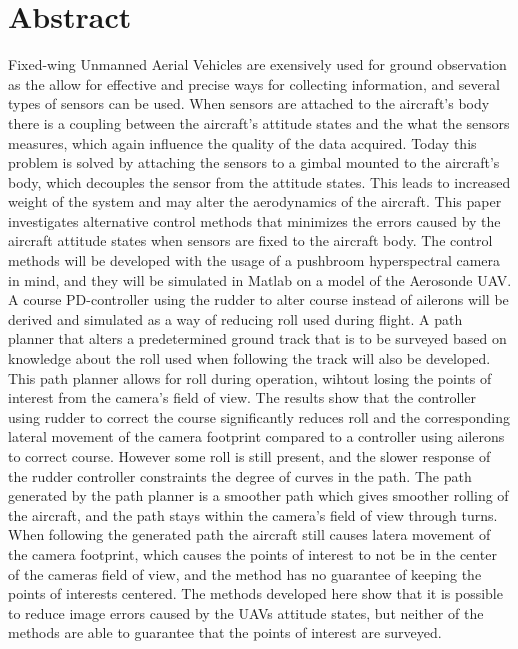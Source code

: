 \section*{Abstract}

Fixed-wing Unmanned Aerial Vehicles are exensively used for ground observation as the allow for effective and precise ways for collecting information, and several types of sensors can be used. When sensors are attached to the aircraft's body there is a coupling between the aircraft's attitude states and the what the sensors measures, which again influence the quality of the data acquired. Today this problem is solved by attaching the sensors to a gimbal mounted to the aircraft's body, which decouples the sensor from the attitude states. This leads to increased weight of the system and may alter the aerodynamics of the aircraft. This paper investigates alternative control methods that minimizes the errors caused by the aircraft attitude states when sensors are fixed to the aircraft body. The control methods will be developed with the usage of a pushbroom hyperspectral camera in mind, and they will be simulated in Matlab on a model of the Aerosonde UAV. A course PD-controller using the rudder to alter course instead of ailerons will be derived and simulated as a way of reducing roll used during flight. A path planner that alters a predetermined ground track that is to be surveyed based on knowledge about the roll used when following the track will also be developed. This path planner allows for roll during operation, wihtout losing the points of interest from the camera's field of view. The results show that the controller using rudder to correct the course significantly reduces roll and the corresponding lateral movement of the camera footprint compared to a controller using ailerons to correct course. However some roll is still present, and the slower response of the rudder controller constraints the degree of curves in the path. The path generated by the path planner is a smoother path which gives smoother rolling of the aircraft, and the path stays within the camera's field of view through turns. When following the generated path the aircraft still causes latera movement of the camera footprint, which causes the points of interest to not be in the center of the cameras field of view, and the method has no guarantee of keeping the points of interests centered. The methods developed here show that it is possible to reduce image errors caused by the UAVs attitude states, but neither of the methods are able to guarantee that the points of interest are surveyed.